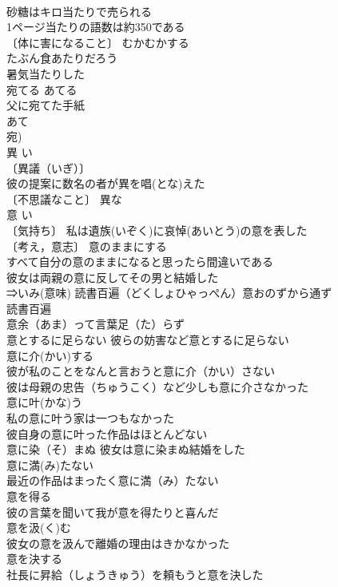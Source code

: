 \documentclass[8pt]{extreport}
\begin{document}
\begin{CJK}{UTF8}{min}
\\	砂糖はキロ当たりで売られる 
\\	1ページ当たりの語数は約350である 
\\	〔体に害になること〕 むかむかする
\\	たぶん食あたりだろう 
\\	暑気当たりした 
\\	宛てる	あてる	
\\	父に宛てた手紙 
\\	あて
\\	宛)
\\	異	い	
\\	〔異議（いぎ）〕　
\\	彼の提案に数名の者が異を唱(とな)えた 
\\	〔不思議なこと〕 異な 
\\	意	い	
\\	〔気持ち〕 私は遺族(いぞく)に哀悼(あいとう)の意を表した 
\\	〔考え，意志〕 意のままにする 
\\	すべて自分の意のままになると思ったら間違いである 
\\	彼女は両親の意に反してその男と結婚した 
\\	⇒いみ(意味) 読書百遍（どくしょひゃっぺん）意おのずから通ず 
\\	読書百遍　
\\	意余（あま）って言葉足（た）らず 
\\	意とするに足らない 彼らの妨害など意とするに足らない 
\\	意に介(かい)する　
\\	彼が私のことをなんと言おうと意に介（かい）さない 
\\	彼は母親の忠告（ちゅうこく）など少しも意に介さなかった 
\\	意に叶(かな)う　
\\	私の意に叶う家は一つもなかった 
\\	彼自身の意に叶った作品はほとんどない 
\\	意に染（そ）まぬ 彼女は意に染まぬ結婚をした 
\\	意に満(み)たない　
\\	最近の作品はまったく意に満（み）たない 
\\	意を得る　
\\	彼の言葉を聞いて我が意を得たりと喜んだ 
\\	意を汲(く)む　
\\	彼女の意を汲んで離婚の理由はきかなかった 
\\	意を決する 
\\	社長に昇給（しょうきゅう）を頼もうと意を決した 

\end{CJK}
\end{document}

